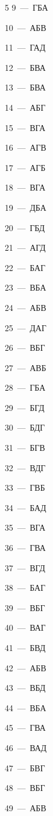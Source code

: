 \documentclass[12pt]{article}
\begin{document}
\begin{multicols}{5}\noindent
\mbox{9~--- ГБА}\par
\mbox{10~--- АБВ}\par
\mbox{11~--- ГАД}\par
\mbox{12~--- БВА}\par
\mbox{13~--- БВА}\par
\mbox{14~--- АБГ}\par
\mbox{15~--- ВГА}\par
\mbox{16~--- АГВ}\par
\mbox{17~--- АГБ}\par
\mbox{18~--- ВГА}\par
\mbox{19~--- ДБА}\par
\mbox{20~--- ГБД}\par
\mbox{21~--- АГД}\par
\mbox{22~--- БАГ}\par
\mbox{23~--- ВБА}\par
\mbox{24~--- АБВ}\par
\mbox{25~--- ДАГ}\par
\mbox{26~--- ВБГ}\par
\mbox{27~--- АВБ}\par
\mbox{28~--- ГБА}\par
\mbox{29~--- БГД}\par
\mbox{30~--- БДГ}\par
\mbox{31~--- БГВ}\par
\mbox{32~--- ВДГ}\par
\mbox{33~--- ГВБ}\par
\mbox{34~--- БАД}\par
\mbox{35~--- ВГА}\par
\mbox{36~--- ГВА}\par
\mbox{37~--- ВГД}\par
\mbox{38~--- БАГ}\par
\mbox{39~--- ВБГ}\par
\mbox{40~--- ВАГ}\par
\mbox{41~--- БВД}\par
\mbox{42~--- АБВ}\par
\mbox{43~--- ВБД}\par
\mbox{44~--- ВБА}\par
\mbox{45~--- ГВА}\par
\mbox{46~--- ВАД}\par
\mbox{47~--- БВГ}\par
\mbox{48~--- ВБГ}\par
\mbox{49~--- АБВ}\par

\end{multicols}
\end{document}

